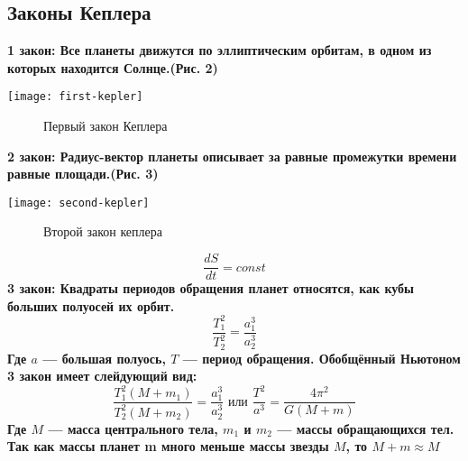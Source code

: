 \subsection{Законы Кеплера}
\bfseries 1 закон: \mdseries  Все планеты движутся по эллиптическим орбитам, в одном из которых находится Солнце.(Рис. 2)
\begin{center}
\texttt{[image: first-kepler]}
\begin{figure}[h!]
\caption {Первый закон Кеплера}
\end{figure}
\end{center}

\bfseries 2 закон: \mdseries Радиус-вектор планеты описывает за равные промежутки времени равные площади.(Рис. 3)
\begin{center}
\texttt{[image: second-kepler]}
\begin{figure}[h!]
\caption {Второй закон кеплера}
\end{figure}
\end{center}\begin{equation}\frac{dS}{dt}=const
\end{equation}
\bfseries 3 закон: \mdseries Квадраты периодов обращения планет относятся, как кубы больших полуосей их орбит.\begin{equation}
\frac{T^2_1}{T^2_2}=\frac{a^3_1}{a^3_2}
\end{equation}
Где $a$ --- большая полуось, $T$ --- период обращения.
Обобщённый Ньютоном 3 закон имеет слейдующий вид:\begin{equation}
\frac{T^2_1(M+m_1)}{T^2_2(M+m_2)}=\frac{a^3_1}{a^3_2} \text{ или } \frac{T^2}{a^3}=\frac{4\pi^2}{G(M+m)} 
\end{equation}
Где $M$ --- масса центрального тела, $m_1$ и $m_2$ --- массы обращающихся тел. Так как массы планет m много меньше массы звезды $M$, то $M+m\approx M$